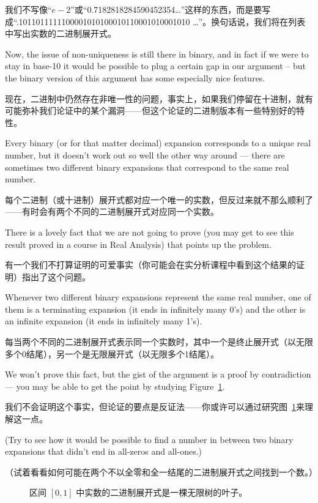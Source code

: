 我们不写像“$e-2$”或“0.7182818284590452354\ldots”这样的东西，而是要写成“.1011011111100001010100010110001010001010 \ldots”。换句话说，我们将在列表中写出实数的二进制展开式。

Now, the issue of non-uniqueness is still there in binary, and
in fact if we were to stay in base-10 it would be possible to plug a certain
gap in our argument -- but the binary version of this argument has some
especially nice features.

现在，二进制中仍然存在非唯一性的问题，事实上，如果我们停留在十进制，就有可能弥补我们论证中的某个漏洞——但这个论证的二进制版本有一些特别好的特性。

Every binary (or for that matter decimal) expansion corresponds to a unique
real number, but it doesn't work out so well the other way around ---
there are sometimes two different binary expansions that correspond to the
same real number.

每个二进制（或十进制）展开式都对应一个唯一的实数，但反过来就不那么顺利了——有时会有两个不同的二进制展开式对应同一个实数。

There is a lovely fact that we are not going to prove (you
may get to see this result proved in a course in Real Analysis) that points up
the problem.

有一个我们不打算证明的可爱事实（你可能会在实分析课程中看到这个结果的证明）指出了这个问题。

Whenever two different binary expansions represent the same
real number, one of them is a terminating expansion (it ends in infinitely
many 0's) and the other is an infinite expansion (it ends in infinitely many
1's).

每当两个不同的二进制展开式表示同一个实数时，其中一个是终止展开式（以无限多个0结尾），另一个是无限展开式（以无限多个1结尾）。

We won't prove this fact, but the gist of the argument is a proof by
contradiction --- you may be able to get the point by studying Figure~\ref{fig:binary_reps}.

我们不会证明这个事实，但论证的要点是反证法——你或许可以通过研究图~\ref{fig:binary_reps}来理解这一点。

(Try to see how it would be possible to find a number in between two binary
expansions that didn't end in all-zeros and all-ones.)

（试着看看如何可能在两个不以全零和全一结尾的二进制展开式之间找到一个数。）

\begin{figure}[!hbtp]
    
    \caption[Binary representations in the unit interval.]{The base-$2$ %
        expansions of reals in the interval $[0, 1]$ are the leaves of an %
        infinite tree.}
    \caption[单位区间内的二进制表示。]{区间 $[0, 1]$ 中实数的二进制展开式是一棵无限树的叶子。}
    \label{fig:binary_reps}
\end{figure}

